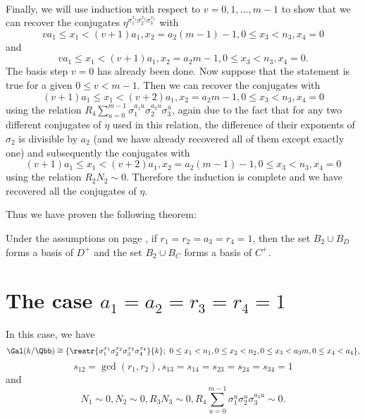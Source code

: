 \paragraph*{}
Finally, we will use induction with respect to $v=0,1,\dots, m-1$ to show that we can recover the conjugates $\eta^{\sigma_1^{x_1}\sigma_2^{x_2}\sigma_3^{x_3}}$ with $$va_1\leq x_1 < (v+1)a_1,x_2=a_2(m-1)-1,0\le x_3<n_3,x_4=0$$ and $$va_1\leq x_1 < (v+1)a_1,x_2=a_2m-1,0\le x_3<n_3,x_4=0.$$
The basis step $v=0$ has already been done. Now suppose that the statement is true for a given $0\leq v<m-1$. Then we can recover the conjugates with $$(v+1)a_1\leq x_1 < (v+2)a_1,x_2=a_2m-1,0\le x_3<n_3,x_4=0$$
using the relation $R_4\sum_{u=0}^{m-1}\sigma_1^{a_1u}\sigma_2^{a_2u}\sigma_3^u$, again due to the fact that for any two different conjugates of $\eta$ used in this relation, the difference of their exponents of $\sigma_2$ is divisible by $a_2$ (and we have already recovered all of them except exactly one) and subsequently the conjugates with $$(v+1)a_1\leq x_1 < (v+2)a_1,x_2=a_2(m-1)-1,0\le x_3<n_3,x_4=0$$ using the relation $R_2N_2\sim 0$.
Therefore the induction is complete and we have recovered all the conjugates of $\eta$. 

Thus we have proven the following theorem:
\begin{theorem}
Under the assumptions on page \pageref{assum}, if $r_1=r_2=a_3=r_4=1$, then the set $B_{2}\cup B_D$ forms a basis of $D^+$ and the set $B_{2}\cup B_C$ forms a basis of $C^+$.
\end{theorem}
\section{The case $a_1=a_2=r_3=r_4=1$}
In this case, we have
$$\Gal(k/\Qbb)\cong
 \{\restr{\sigma_1^{x_1}\sigma_2^{x_2}\sigma_3^{x_3}\sigma_4^{x_4}}{k};~  0\leq x_1<n_1, 0\leq x_2<n_2, 0\leq x_3<a_3m,0\leq x_4<a_4\},$$
  $$s_{12}=\gcd(r_1,r_2),s_{13}=s_{14}=s_{23}=s_{24}=s_{34}=1$$
 and $$N_1\sim 0, N_2\sim 0, R_3N_3 \sim 0, R_4 \sum_{u=0}^{m-1}\sigma_1^u\sigma_2^u\sigma_3^{a_3u} \sim 0.$$

